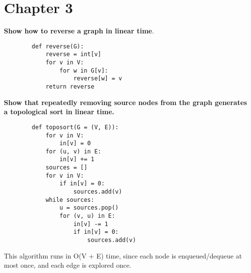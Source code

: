 \section{Chapter 3}

\begin{problem}{3.5}
    \textbf{Show how to reverse a graph in linear time}.
    \begin{lstlisting}
        def reverse(G):
            reverse = int[v]
            for v in V:
                for w in G[v]:
                    reverse[w] = v
            return reverse
    \end{lstlisting}
\end{problem}

\begin{problem}{3.14}
    \textbf{Show that repeatedly removing source nodes from the graph generates a topological sort in linear time.}
    \begin{lstlisting}
        def toposort(G = (V, E)):
            for v in V: 
                in[v] = 0
            for (u, v) in E:
                in[v] += 1
            sources = []
            for v in V:
                if in[v] = 0:
                    sources.add(v)
            while sources:
                u = sources.pop()
                for (v, u) in E:
                    in[v] -= 1
                    if in[v] = 0:
                        sources.add(v)
    \end{lstlisting}
    This algorithm runs in O(V + E) time, since each node is enqueued/dequeue at most once, and each edge is explored once.
\end{problem}

